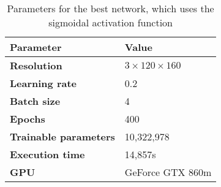 \begin{table}[h!]
	\footnotesize
	\centering
	\begin{tabular}{ll}
	\hline
		\textbf{Parameter} & \textbf{Value}\\
	\hline
	\hline
		\textbf{Resolution} & $3 \times 120\times160$\\
		\textbf{Learning rate} & 0.2\\
		\textbf{Batch size} & 4\\
		\textbf{Epochs} & 400\\
		\textbf{Trainable parameters} & 10,322,978\\
		\textbf{Execution time} & 14,857s\\
		\textbf{GPU} & GeForce GTX 860m\\
	\hline
	\end{tabular}
	\caption{Parameters for the best network, which uses the sigmoidal activation function}
	\label{tab:params_learningrates_network}
\end{table}

